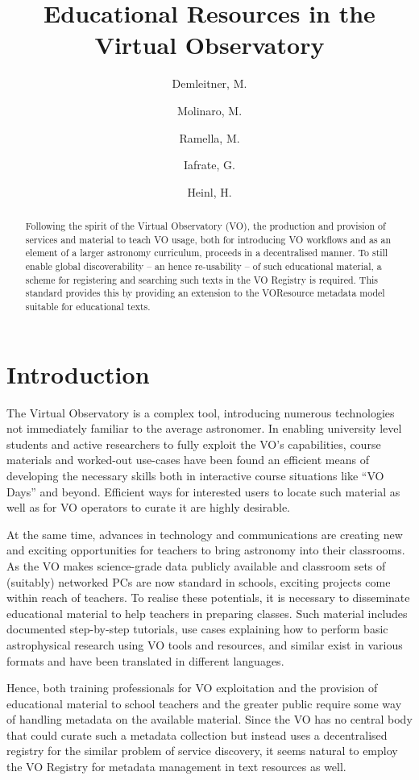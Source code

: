 \documentclass{ivoa}
\author{Demleitner, M.}
\author{Molinaro, M.}
\author{Ramella, M.}
\author{Iafrate, G.}
\author{Heinl, H.}
\title{Educational Resources in the Virtual Observatory}
\begin{document}
\begin{abstract}
Following the spirit of the Virtual Observatory (VO), the production and
provision of services and material to teach VO usage, both for
introducing VO workflows and as an element of a larger astronomy
curriculum, proceeds in a decentralised manner.  To still enable global
discoverability -- an hence re-usability -- of such educational
material, a scheme for registering and searching such texts in the VO
Registry is required.  This standard provides this by providing an
extension to the VOResource metadata model suitable for educational
texts.
\end{abstract}


\section{Introduction}

The Virtual Observatory is a complex tool, introducing numerous
technologies not immediately familiar to the average astronomer.
In enabling university level students
and active researchers to fully exploit the VO's capabilities, course
materials and worked-out use-cases have been found an efficient means of
developing the necessary skills both in interactive course situations
like ``VO Days'' and beyond.
Efficient ways for interested users to locate such
material as well as for VO operators to curate it are highly desirable.

At the same time, advances in technology and
communications are creating new and exciting
opportunities for teachers to bring astronomy into their
classrooms.  As the VO makes science-grade data publicly available and
classroom sets of (suitably) networked PCs are now standard in schools,
exciting projects come within reach of teachers.  To realise these
potentials,
it is necessary to disseminate educational material to help teachers
in preparing classes.  Such material includes documented step-by-step
tutorials, use cases explaining how to perform basic astrophysical research
using VO tools and resources, and similar exist in various formats and
have been translated in different languages.

Hence, both training professionals for VO exploitation and the provision
of educational material to school teachers and the greater public
require some way of handling metadata on the available material.  Since
the VO has no central body that could curate such a metadata collection
but instead uses a decentralised registry for the similar problem of
service discovery, it seems natural to employ the VO Registry for
metadata management in text resources as well.
\end{document}
